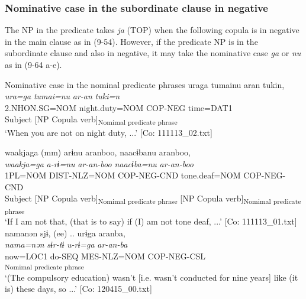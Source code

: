 \subsubsection{Nominative case in the subordinate clause in negative}\label{sec:9.3.3.1}

The NP in the predicate takes \textit{ja} (TOP) when the following copula is in negative in the main clause as in (9-54). However, if the predicate NP is in the subordinate clause and also in negative, it may take the nominative case \textit{ga} or \textit{nu} as in (9-64 a-e).

\ea   Nominative case in the nominal predicate phrases \label{ex:9.64}
\ea \relax [= (5-9 b)]
    \gllll  uraga  tumainu  aran  tukin,\\
      \textit{ura=ga}  \textit{tumai=nu}  \textit{ar-an}  \textit{tuki=n}\\
      2.NHON.SG=NOM  night.duty=NOM  COP-NEG  time=DAT1\\
      Subject  [NP  Copula verb]\textsubscript{Nomimal predicate phrase}  \\
      \glt       ‘When you are not on night duty, ...’ [Co: 111113\_02.txt]

\ex %
     \gllll waakjaga  (mm)  arɨnu  aranboo, naacɨbanu  aranboo,\\
      \textit{waakja=ga}    \textit{a-rɨ=nu}  \textit{ar-an-boo}  \textit{naacɨba=nu}  \textit{ar-an-boo}\\                                                                  
      1PL=NOM                  DIST-NLZ=NOM  COP-NEG-CND              tone.deaf=NOM  COP-NEG-CND\\
      Subject    [NP  Copula verb]\textsubscript{Nomimal predicate phrase} [NP  Copula verb]\textsubscript{Nomimal predicate phrase}\\
      \glt  ‘If I am not that, (that is to say) if (I) am not tone deaf, ...’   [Co: 111113\_01.txt]
\ex \label{ex:.c} %
    \gllll  namanən  sjɨ,  (ee)  ..  urɨga  aranba,\\
      \textit{nama=nən}  \textit{sɨr-tɨ}      \textit{u-rɨ=ga}  \textit{ar-an-ba}\\
      now=LOC1  do-SEQ      MES-NLZ=NOM  COP-NEG-CSL\\
              [NP  Copula verb]\textsubscript{Nomimal predicate phrase}\\
      \glt       ‘(The compulsory education) wasn’t [i.e. wasn’t conducted for nine years] like (it is) these days, so ...’ [Co: 120415\_00.txt]

